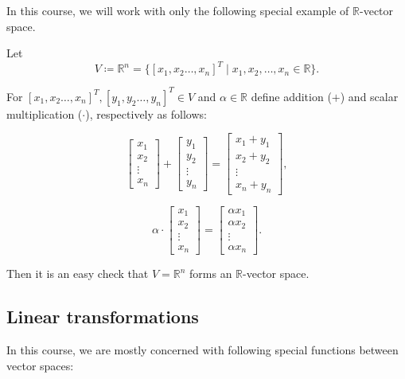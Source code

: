 In this course, we will work with only the following special example of \( \mathbb{R} \)-vector space.
\begin{example}
	Let
	\begin{equation}
		V \coloneq \mathbb{R}^n = \{ [x_1, x_2 \ldots, x_n]^T \mid x_1, x_2, \ldots, x_n \in \mathbb{R} \}.
		\label{eq:vectors-1}
	\end{equation}

	For \( [x_1, x_2 \ldots, x_n]^T, [y_1, y_2 \ldots, y_n]^T \in V  \) and \( \alpha \in \mathbb{R} \) define addition (\( + \)) and scalar multiplication (\( \cdot \)), respectively as follows:

	\begin{equation}
		\begin{bmatrix} x_1\\ x_2\\ \vdots\\ x_n \end{bmatrix} + \begin{bmatrix} y_1\\ y_2\\ \vdots\\ y_n \end{bmatrix} = \begin{bmatrix} x_1 + y_1\\ x_2 + y_2\\ \vdots\\ x_n + y_n \end{bmatrix},
		\label{eq:vectors-2}
	\end{equation}

	\begin{equation}
		\alpha \cdot \begin{bmatrix} x_1\\ x_2\\ \vdots\\ x_n \end{bmatrix} = \begin{bmatrix} \alpha x_1\\ \alpha x_2\\ \vdots\\ \alpha x_n \end{bmatrix}.
		\label{eq:vectors-3}
	\end{equation}

	Then it is an easy check that \( V = \mathbb{R}^n \) forms an \( \mathbb{R} \)-vector space.
\end{example}

\subsection{Linear transformations}
In this course, we are mostly concerned with following special functions between vector spaces:

